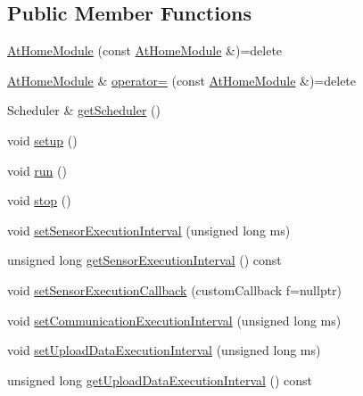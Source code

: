 \subsection*{Public Member Functions}
\begin{DoxyCompactItemize}
\item 
\mbox{\hyperlink{classathome_1_1module_1_1_at_home_module_ad78045943a579874ec16e14cf976eada}{At\+Home\+Module}} (const \mbox{\hyperlink{classathome_1_1module_1_1_at_home_module}{At\+Home\+Module}} \&)=delete
\item 
\mbox{\hyperlink{classathome_1_1module_1_1_at_home_module}{At\+Home\+Module}} \& \mbox{\hyperlink{classathome_1_1module_1_1_at_home_module_aec07a48057f5d52c9adaea375a6a7ad4}{operator=}} (const \mbox{\hyperlink{classathome_1_1module_1_1_at_home_module}{At\+Home\+Module}} \&)=delete
\item 
Scheduler \& \mbox{\hyperlink{classathome_1_1module_1_1_at_home_module_a954f37f05e5738f270a35fef58782ba6}{get\+Scheduler}} ()
\item 
void \mbox{\hyperlink{classathome_1_1module_1_1_at_home_module_a5354c736954a788c51e7cf25f6ccf89d}{setup}} ()
\item 
void \mbox{\hyperlink{classathome_1_1module_1_1_at_home_module_ac39915bf4a255e3610515bc18af3029d}{run}} ()
\item 
void \mbox{\hyperlink{classathome_1_1module_1_1_at_home_module_a5589c1eb7edd2ab45d0a3de7bb475bbe}{stop}} ()
\item 
void \mbox{\hyperlink{classathome_1_1module_1_1_at_home_module_a9a3b04d8f83ecbe0e8e368b697449326}{set\+Sensor\+Execution\+Interval}} (unsigned long ms)
\item 
unsigned long \mbox{\hyperlink{classathome_1_1module_1_1_at_home_module_ae0d4458da2bafd104386671d300fb562}{get\+Sensor\+Execution\+Interval}} () const
\item 
void \mbox{\hyperlink{classathome_1_1module_1_1_at_home_module_a29464ea78833e571a589c0cf0d17321b}{set\+Sensor\+Execution\+Callback}} (custom\+Callback f=nullptr)
\item 
void \mbox{\hyperlink{classathome_1_1module_1_1_at_home_module_ad28a042bd9f793d9dbd944ec4f76156b}{set\+Communication\+Execution\+Interval}} (unsigned long ms)
\item 
void \mbox{\hyperlink{classathome_1_1module_1_1_at_home_module_aa02b94ab5009d59d337144db364053a6}{set\+Upload\+Data\+Execution\+Interval}} (unsigned long ms)
\item 
unsigned long \mbox{\hyperlink{classathome_1_1module_1_1_at_home_module_a6186e04da0e46cf463d24947538380bb}{get\+Upload\+Data\+Execution\+Interval}} () const

\end{DoxyCompactItemize}
